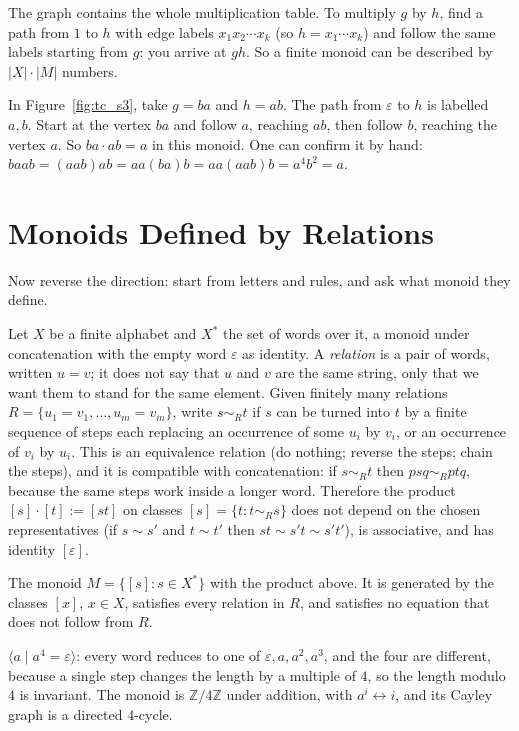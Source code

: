 \documentclass[11pt]{article}
\begin{document}
The graph contains the whole multiplication table. To multiply $g$ by $h$, find a path from $1$ to $h$ with edge labels $x_1x_2\cdots x_k$ (so $h=x_1\cdots x_k$) and follow the same labels starting from $g$: you arrive at $gh$.
So a finite monoid can be described by $|X|\cdot|M|$ numbers.

\begin{examplebox}
In Figure~\ref{fig:tc_s3}, take $g=ba$ and $h=ab$. The path from $\varepsilon$ to $h$ is labelled $a,b$. Start at the vertex $ba$ and follow $a$, reaching $ab$, then follow $b$, reaching the vertex $a$.
So $ba\cdot ab=a$ in this monoid. One can confirm it by hand: $baab=(aab)ab=aa(ba)b=aa(aab)b=a^4b^2=a$.
\end{examplebox}

\section{Monoids Defined by Relations}\label{sec:presentation}
Now reverse the direction: start from letters and rules, and ask what monoid they define.

Let $X$ be a finite alphabet and $X^*$ the set of words over it, a monoid under concatenation with the empty word $\varepsilon$ as identity. A \emph{relation} is a pair of words, written $u=v$; it does not say that $u$ and $v$ are the same string,
only that we want them to stand for the same element. Given finitely many relations $R=\{u_1=v_1,\dots,u_m=v_m\}$, write $s\sim_R t$ if $s$ can be turned into $t$ by a finite sequence of steps each replacing an occurrence of some $u_i$ by $v_i$, or an occurrence of $v_i$ by $u_i$.
This is an equivalence relation (do nothing; reverse the steps; chain the steps), and it is compatible with concatenation: if $s\sim_R t$ then $psq\sim_R ptq$, because the same steps work inside a longer word.
Therefore the product $[s]\cdot[t]:=[st]$ on classes $[s]=\{t: t\sim_R s\}$ does not depend on the chosen representatives (if $s\sim s'$ and $t\sim t'$ then $st\sim s't\sim s't'$), is associative, and has identity $[\varepsilon]$.

\begin{definitionbox}
The monoid $M=\{[s]:s\in X^*\}$ with the product above. It is generated by the classes $[x]$, $x\in X$, satisfies every relation in $R$, and satisfies no equation that does not follow from $R$.
\end{definitionbox}

\begin{examplebox}
$\langle a\mid a^4=\varepsilon\rangle$: every word reduces to one of $\varepsilon,a,a^2,a^3$, and the four are different, because a single step changes the length by a multiple of $4$, so the length modulo $4$ is invariant.
The monoid is $\mathbb{Z}/4\mathbb{Z}$ under addition, with $a^i\leftrightarrow i$, and its Cayley graph is a directed $4$-cycle.
\end{examplebox}
\end{document}
